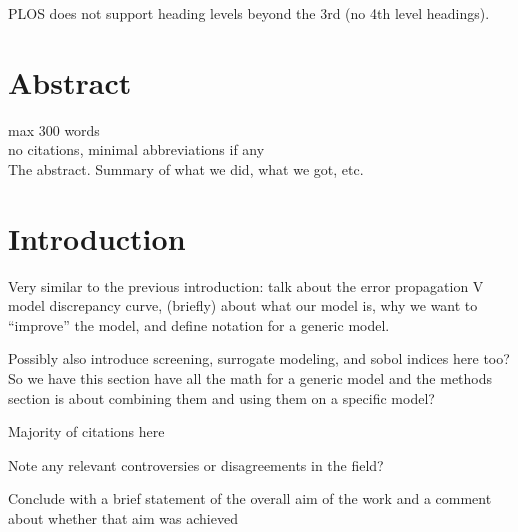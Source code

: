 \documentclass[10pt,letterpaper]{article}
\newcommand{\lorem}{{\bf LOREM}}
\newcommand{\ipsum}{{\bf IPSUM}}
\begin{document}
	PLOS does not support heading levels beyond the 3rd (no 4th level headings).
	
	\section*{Abstract}
	\textinterrobang max 300 words\\
	\textinterrobang no citations, minimal abbreviations if any\\
	
	The abstract. Summary of what we did, what we got, etc.
	
	

	
	\linenumbers
	
	
	\section*{Introduction}
	
	Very similar to the previous introduction: talk about the error propagation V model discrepancy curve,  (briefly) about what our model is, why we want to ``improve'' the model, and define notation for a generic model.
	
	Possibly also introduce screening, surrogate modeling, and sobol indices here too? So we have this section have all the math for a generic model and the methods section is about combining them and using them on a specific model?
	
	\textinterrobang Majority of citations here 
	
	\textinterrobang Note any relevant controversies or disagreements in the field?
	
	Conclude with a brief statement of the overall aim of the work and a comment about whether that aim was achieved
	
\end{document}
